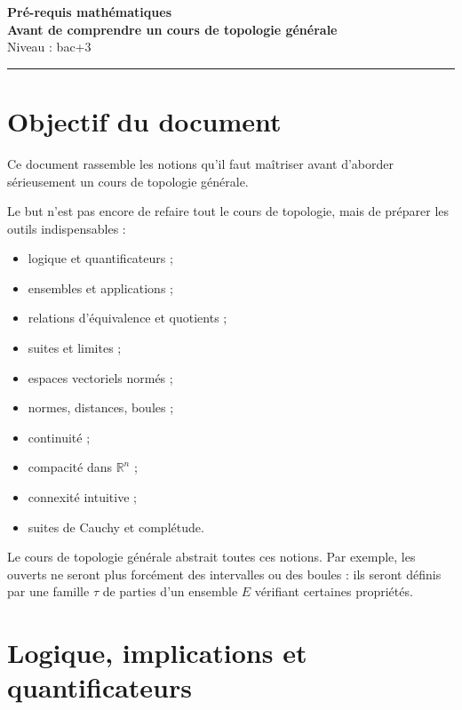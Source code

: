\documentclass[11pt,a4paper]{article}
\theoremstyle{definition}
\theoremstyle{plain}
\newcommand{\R}{\mathbb{R}}
\begin{document}
\begin{center}
    {\Huge \textbf{Pré-requis mathématiques}}\\[0.2cm]
    {\Large \textbf{Avant de comprendre un cours de topologie générale}}\\[0.3cm]
    {\large Niveau : bac+3}\\[0.3cm]
    \rule{0.85\textwidth}{0.5pt}
\end{center}

\vspace{0.5cm}

\tableofcontents

\newpage

\section*{Objectif du document}

Ce document rassemble les notions qu'il faut maîtriser avant d'aborder sérieusement un cours de topologie générale.

Le but n'est pas encore de refaire tout le cours de topologie, mais de préparer les outils indispensables :
\begin{itemize}
    \item logique et quantificateurs ;
    \item ensembles et applications ;
    \item relations d'équivalence et quotients ;
    \item suites et limites ;
    \item espaces vectoriels normés ;
    \item normes, distances, boules ;
    \item continuité ;
    \item compacité dans $\R^n$ ;
    \item connexité intuitive ;
    \item suites de Cauchy et complétude.
\end{itemize}

Le cours de topologie générale abstrait toutes ces notions. Par exemple, les ouverts ne seront plus forcément des intervalles ou des boules : ils seront définis par une famille $\tau$ de parties d'un ensemble $E$ vérifiant certaines propriétés.

\newpage

\section{Logique, implications et quantificateurs}
\end{document}
